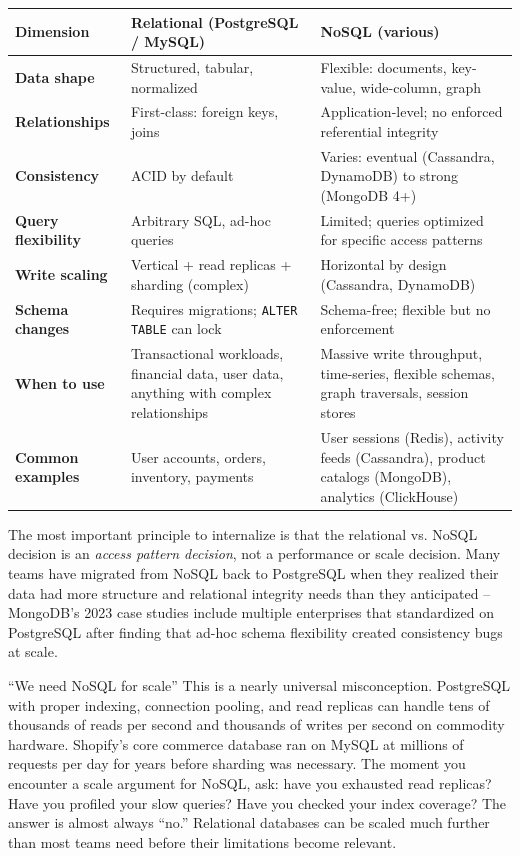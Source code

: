 \documentclass[11pt,a4paper]{article}
\begin{document}
\begin{center}
\renewcommand{\arraystretch}{1.4}
\begin{tabularx}{\textwidth}{>{\bfseries}p{3.2cm} X X}
\toprule
\textbf{Dimension} & \textbf{Relational (PostgreSQL / MySQL)} & \textbf{NoSQL (various)} \\
\midrule
Data shape & Structured, tabular, normalized & Flexible: documents, key-value, wide-column, graph \\
\addlinespace
Relationships & First-class: foreign keys, joins & Application-level; no enforced referential integrity \\
\addlinespace
Consistency & ACID by default & Varies: eventual (Cassandra, DynamoDB) to strong (MongoDB 4+) \\
\addlinespace
Query flexibility & Arbitrary SQL, ad-hoc queries & Limited; queries optimized for specific access patterns \\
\addlinespace
Write scaling & Vertical + read replicas + sharding (complex) & Horizontal by design (Cassandra, DynamoDB) \\
\addlinespace
Schema changes & Requires migrations; \texttt{ALTER TABLE} can lock & Schema-free; flexible but no enforcement \\
\addlinespace
When to use & Transactional workloads, financial data, user data, anything with complex relationships & Massive write throughput, time-series, flexible schemas, graph traversals, session stores \\
\addlinespace
Common examples & User accounts, orders, inventory, payments & User sessions (Redis), activity feeds (Cassandra), product catalogs (MongoDB), analytics (ClickHouse) \\
\bottomrule
\end{tabularx}
\end{center}

The most important principle to internalize is that the relational vs. NoSQL decision is an \emph{access pattern decision}, not a performance or scale decision. Many teams have migrated from NoSQL back to PostgreSQL when they realized their data had more structure and relational integrity needs than they anticipated -- MongoDB's 2023 case studies include multiple enterprises that standardized on PostgreSQL after finding that ad-hoc schema flexibility created consistency bugs at scale.

\begin{trapbox}{``We need NoSQL for scale''}
This is a nearly universal misconception. PostgreSQL with proper indexing, connection pooling, and read replicas can handle tens of thousands of reads per second and thousands of writes per second on commodity hardware. Shopify's core commerce database ran on MySQL at millions of requests per day for years before sharding was necessary. The moment you encounter a scale argument for NoSQL, ask: have you exhausted read replicas? Have you profiled your slow queries? Have you checked your index coverage? The answer is almost always ``no.'' Relational databases can be scaled much further than most teams need before their limitations become relevant.
\end{trapbox}
\end{document}
